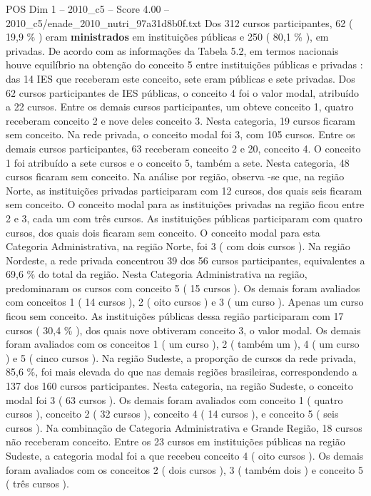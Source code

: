 \begin{textsample}{POS Dim 1 – 2010\_c5 – Score 4.00 – 2010\_c5/enade\_2010\_nutri\_97a31d8b0f.txt}
Dos 312 cursos participantes, 62 ( 19,9 \% ) eram \textbf{ministrados} em instituições públicas e 250 ( 80,1 \% ), em privadas.
De acordo com as informações da Tabela 5.2, em termos nacionais houve equilíbrio na obtenção do conceito 5 entre instituições públicas e privadas : das 14 IES que receberam este conceito, sete eram públicas e sete privadas.
Dos 62 cursos participantes de IES públicas, o conceito 4 foi o valor modal, atribuído a 22 cursos.
Entre os demais cursos participantes, um obteve conceito 1, quatro receberam conceito 2 e nove deles conceito 3.
Nesta categoria, 19 cursos ficaram sem conceito.
Na rede privada, o conceito modal foi 3, com 105 cursos.
Entre os demais cursos participantes, 63 receberam conceito 2 e 20, conceito 4.
O conceito 1 foi atribuído a sete cursos e o conceito 5, também a sete.
Nesta categoria, 48 cursos ficaram sem conceito.
Na análise por região, observa -se que, na região Norte, as instituições privadas participaram com 12 cursos, dos quais seis ficaram sem conceito.
O conceito modal para as instituições privadas na região ficou entre 2 e 3, cada um com três cursos.
As instituições públicas participaram com quatro cursos, dos quais dois ficaram sem conceito.
O conceito modal para esta Categoria Administrativa, na região Norte, foi 3 ( com dois cursos ).
Na região Nordeste, a rede privada concentrou 39 dos 56 cursos participantes, equivalentes a 69,6 \% do total da região.
Nesta Categoria Administrativa na região, predominaram os cursos com conceito 5 ( 15 cursos ).
Os demais foram avaliados com conceitos 1 ( 14 cursos ), 2 ( oito cursos ) e 3 ( um curso ).
Apenas um curso ficou sem conceito.
As instituições públicas dessa região participaram com 17 cursos ( 30,4 \% ), dos quais nove obtiveram conceito 3, o valor modal.
Os demais foram avaliados com os conceitos 1 ( um curso ), 2 ( também um ), 4 ( um curso ) e 5 ( cinco cursos ).
Na região Sudeste, a proporção de cursos da rede privada, 85,6 \%, foi mais elevada do que nas demais regiões brasileiras, correspondendo a 137 dos 160 cursos participantes.
Nesta categoria, na região Sudeste, o conceito modal foi 3 ( 63 cursos ).
Os demais foram avaliados com conceito 1 ( quatro cursos ), conceito 2 ( 32 cursos ), conceito 4 ( 14 cursos ), e conceito 5 ( seis cursos ).
Na combinação de Categoria Administrativa e Grande Região, 18 cursos não receberam conceito.
Entre os 23 cursos em instituições públicas na região Sudeste, a categoria modal foi a que recebeu conceito 4 ( oito cursos ).
Os demais foram avaliados com os conceitos 2 ( dois cursos ), 3 ( também dois ) e conceito 5 ( três cursos ).

\end{textsample}
